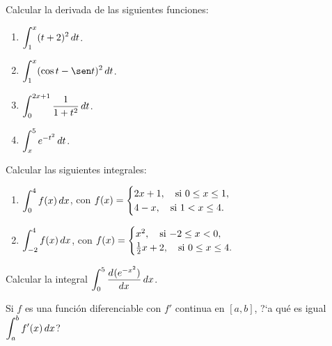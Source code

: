 \item Calcular la derivada de las siguientes funciones:
\begin{multicols}{2}
  \begin{enumerate}
    \item $\D \int_1^x (t+2)^2 \dt$.
    \item $\D \int_1^x (\cos t-\sen t)^2 \dt$.
    \item $\D \int_0^{2x+1} \frac{1}{1+t^2} \dt$.
    \item $\D \int_x^5 e^{-t^2} \dt$.
  \end{enumerate}
\end{multicols}

\item Calcular las siguientes integrales:
  \begin{enumerate}
    \item $\D \int_0^4 f(x)\dx$, con 
    $\D f(x)=\begin{cases}
      2x+1, \quad \text{si $0\le x \le 1$},
      \\
      4-x, \quad \text{si $1<x\le 4$}.
    \end{cases}
      $
      \item $\D \int_{-2}^4 f(x)\dx$, con 
          $\D f(x)=\begin{cases}
        x^2, \quad \text{si $-2\le x < 0$},
        \\
        \frac12 x+2, \quad \text{si $0\le x\le 4$}.
          \end{cases}
        $
  \end{enumerate}

\item Calcular la integral $\D\int_0^{5} \dd[]{(e^{-x^2})}{x}\dx$.

\item Si $f$ es una función diferenciable con $f'$ continua en $[a,b]$, ?`a qué es igual $\D\int_a^b f'(x) \dx$?